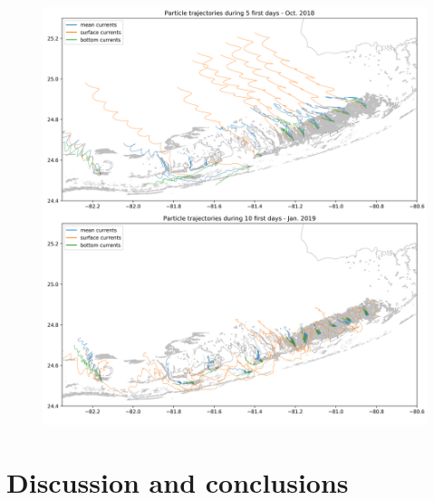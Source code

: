 \documentclass[utf8]{frontiersSCNS}
\begin{document}
\begin{figure}
    \centering
    \includegraphics[width=.9\textwidth]{figures/traj.png}
    \caption{}
    \label{fig:traj}
\end{figure}


\section{Discussion and conclusions}
\end{document}
